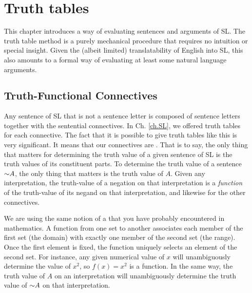 \chapter{Truth tables}
\label{ch.TruthTables}

This chapter introduces a way of evaluating sentences and arguments of SL.
The truth table method is a purely mechanical procedure that requires no intuition or special insight.
Given the (albeit limited) translatability of English into SL, this also amounts to a formal way of evaluating at least some natural language arguments.




\section{Truth-Functional Connectives}

Any sentence of SL that is not a sentence letter is composed of sentence letters together with the sentential connectives.
In Ch. \ref{ch.SL}, we offered truth tables for each connective.
The fact that it is possible to give truth tables like this is very significant.
It means that our connectives are .
That is to say, the only thing that matters for determining the truth value of a given sentence of SL is the truth values of its constituent parts.
To determine the truth value of a sentence $\enot A$, the only thing that matters is the truth value of $A$.
Given any interpretation, the truth-value of a negation on that interpretation is a \emph{function} of the truth-value of its negand on that interpretation, and likewise for the other connectives.

We are using the same notion of a  that you have probably encountered in mathematics.
A function from one set to another associates each member of the first set (the domain) with exactly one member of the second set (the range).
Once the first element is fixed, the function uniquely selects an element of the second set.
For instance, any given numerical value of $x$ will unambiguously determine the value of $x^{2}$, so $f(x)=x^{2}$ is a function.
In the same way, the truth value of $A$ on an interpretation will unambiguously determine the truth value of $\enot A$ on that interpretation.

